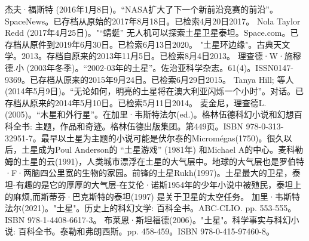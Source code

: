 \begin{enumerate}
 杰夫·福斯特 (2016年1月8日)。“NASA扩大了下一个新前沿竞赛的前沿”。SpaceNews。已存档从原始的2017年8月18日。已检索4月20日2017。
 Nola Taylor Redd (2017年4月25日)。"“蜻蜓” 无人机可以探索土星卫星泰坦。Space.com。已存档从原件到2019年6月30日。已检索6月13日2020。
 "土星环边缘"。古典天文学。2013。存档自原来的2013年11月5日。已检索8月4日2013。
 理查德·W·施穆德.小 (2003年冬季)。“2002-03年的土星”。佐治亚科学杂志。61(4)。ISSN0147-9369。已存档从原来的2015年9月24日。已检索6月29日2015。 
 Tanya Hill; 等人 (2014年5月9日)。“无论如何，明亮的土星将在澳大利亚闪烁一个小时”。对话。已存档从原来的2014年5月10日。已检索5月11日2014。
 麦金尼，理查德L.(2005)。“木星和外行星”。在加里·韦斯特法尔(ed.)。格林伍德科幻小说和幻想百科全书: 主题，作品和奇迹。格林伍德出版集团。第449页。ISBN 978-0-313-32951-7。最早以土星为主题的小说可能是伏尔泰的Micromégas(1750)。很久以后，土星成为Poul Anderson的 “土星游戏” (1981年) 和Michael A的中心。麦科勒姆的土星的云(1991)，人类城市漂浮在土星的大气层中。地球的大气层也是罗伯特·F·两脑四公里宽的生物的家园。前锋的土星Rukh(1997)。土星最大的卫星，泰坦-有趣的是它的厚厚的大气层-在艾伦·诺斯1954年的少年小说中被殖民，泰坦上的麻烦,而斯蒂芬·巴克斯特的泰坦(1997) 是关于卫星的太空任务。
 加里·韦斯特法尔(2021)。"土星"。历史上的科幻文学: 百科全书。ABC-CLIO. pp. 553-555。ISBN 978-1-4408-6617-3。
 布莱恩·斯坦福德(2006)。"土星"。科学事实与科幻小说: 百科全书。泰勒和弗朗西斯。pp. 458-459。ISBN 978-0-415-97460-8。
\end{enumerate}










